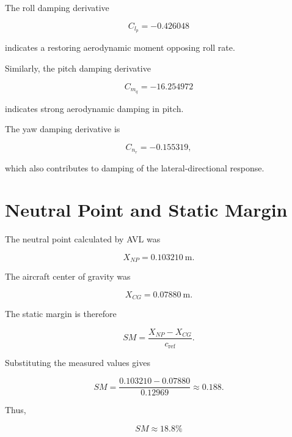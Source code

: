\documentclass[11pt,a4paper]{article}
\begin{document}
The roll damping derivative

\begin{equation}
C_{l_p}=-0.426048
\end{equation}

indicates a restoring aerodynamic moment opposing roll rate.

Similarly, the pitch damping derivative

\begin{equation}
C_{m_q}=-16.254972
\end{equation}

indicates strong aerodynamic damping in pitch.

The yaw damping derivative is

\begin{equation}
C_{n_r}=-0.155319,
\end{equation}

which also contributes to damping of the lateral-directional response.

\section{Neutral Point and Static Margin}

The neutral point calculated by AVL was

\begin{equation}
X_{NP}=0.103210~\mathrm{m}.
\end{equation}

The aircraft center of gravity was

\begin{equation}
X_{CG}=0.07880~\mathrm{m}.
\end{equation}

The static margin is therefore

\begin{equation}
SM=
\frac{X_{NP}-X_{CG}}{c_{\mathrm{ref}}}.
\end{equation}

Substituting the measured values gives

\begin{equation}
SM=
\frac{0.103210-0.07880}{0.12969}
\approx0.188.
\end{equation}

Thus,

\begin{equation}
\boxed{SM\approx18.8\%}
\end{equation}
\end{document}
